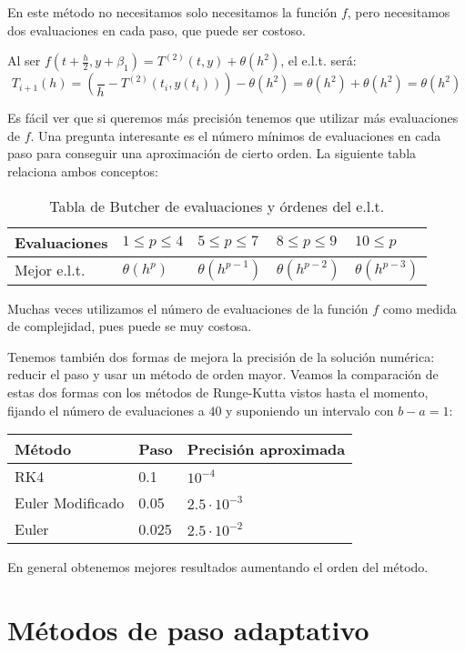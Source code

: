 \begin{remark}
    En este método no necesitamos solo necesitamos la función $f$, pero necesitamos dos evaluaciones en cada paso, que puede ser costoso.
\end{remark}

\begin{remark}
    Al ser $ f(t+\frac{h}{2}, y+\beta_1)=T^{(2)}(t,y)+\theta(h^2) $, el e.l.t. será:
    $$
    T_{i+1}(h)= \left(\frac{}{h} - T^{(2)}(t_i, y(t_i))\right) - \theta(h^2)
    =\theta(h^2)+ \theta(h^2)
    =\theta(h^2)
    $$
\end{remark}


Es fácil ver que si queremos más precisión tenemos que utilizar más evaluaciones de $f$. Una pregunta interesante es el número mínimos de evaluaciones en cada paso para conseguir una aproximación de cierto orden. La siguiente tabla relaciona ambos conceptos:

\begin{table}[H]
\centering
\begin{tabular}{|l||l|l|l|l|}
    \hline
Evaluaciones & $1\leq p \leq 4$ & $5\leq p\leq 7$ & $8\leq p\leq 9$  & $10\leq p$ \\
    \hline
Mejor e.l.t. & $\theta(h^p)$ & $\theta(h^{p-1})$ & $\theta(h^{p-2})$ & $\theta(h^{p-3})$ \\
    \hline
\end{tabular}
\caption{Tabla de Butcher de evaluaciones y órdenes del e.l.t.}
\end{table}

Muchas veces utilizamos el número de evaluaciones de la función $f$ como medida de complejidad, pues puede se muy costosa.

Tenemos también dos formas de mejora la precisión de la solución numérica: reducir el paso y usar un método de orden mayor. Veamos la comparación de estas dos formas con los métodos de Runge-Kutta vistos hasta el momento, fijando el número de evaluaciones a $40$ y suponiendo un intervalo con $b-a=1$:

\begin{table}[H]
\centering
\begin{tabular}{|l|l|l|}
    \hline
Método           & Paso  & Precisión aproximada \\
    \hline
    \hline
RK4              & 0.1   & $10^{-4}$ \\
    \hline
Euler Modificado & 0.05  & $2.5\cdot 10^{-3}$ \\
    \hline
Euler            & 0.025 & $2.5\cdot 10^{-2}$ \\
    \hline
\end{tabular}
\end{table}

En general obtenemos mejores resultados aumentando el orden del método.


\section{Métodos de paso adaptativo}
